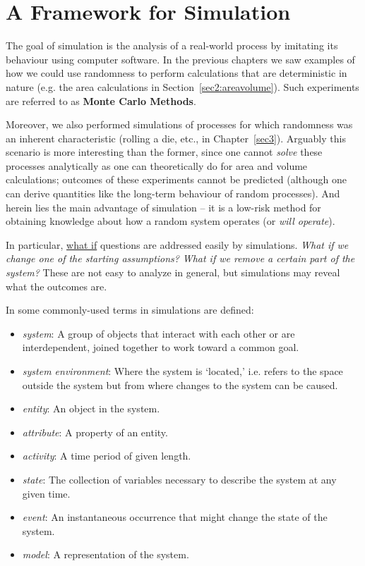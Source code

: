 

\section{A Framework for Simulation}

The goal of simulation is the analysis of a real-world process by imitating its behaviour using computer software.
In the previous chapters we saw examples of how we could use randomness to perform calculations that are deterministic in nature (e.g. the area calculations in Section~\ref{sec2:areavolume}).
Such experiments are referred to as \textbf{Monte Carlo Methods}.

Moreover, we also performed simulations of processes for which randomness was an inherent characteristic (rolling a die, etc., in Chapter~\ref{sec3}).
Arguably this scenario is more interesting than the former, since one cannot \emph{solve} these processes analytically as one can theoretically do for area and volume calculations; outcomes of these experiments cannot be predicted (although one can derive quantities like the long-term behaviour of random processes).
And herein lies the main advantage of simulation -- it is a low-risk method for obtaining knowledge about how a random system operates (or \emph{will operate}).

In particular, \underline{what if} questions are addressed easily by simulations.
\emph{What if we change one of the starting assumptions?}
\emph{What if we remove a certain part of the system?}
These are not easy to analyze in general, but simulations may reveal what the outcomes are.

In \cite{banks2010} some commonly-used terms in simulations are defined:

\begin{itemize}
	\item \emph{system}: A group of objects that interact with each other or are interdependent, joined together to work toward a common goal.
	\item \emph{system environment}: Where the system is `located,' i.e. refers to the space outside the system but from where changes to the system can be caused.
	\item \emph{entity}: An object in the system.
	\item \emph{attribute}: A property of an entity.
	\item \emph{activity}: A time period of given length.
	\item \emph{state}: The collection of variables necessary to describe the system at any given time.
	\item \emph{event}: An instantaneous occurrence that might change the state of the system.
	\item \emph{model}: A representation of the system.
\end{itemize}

